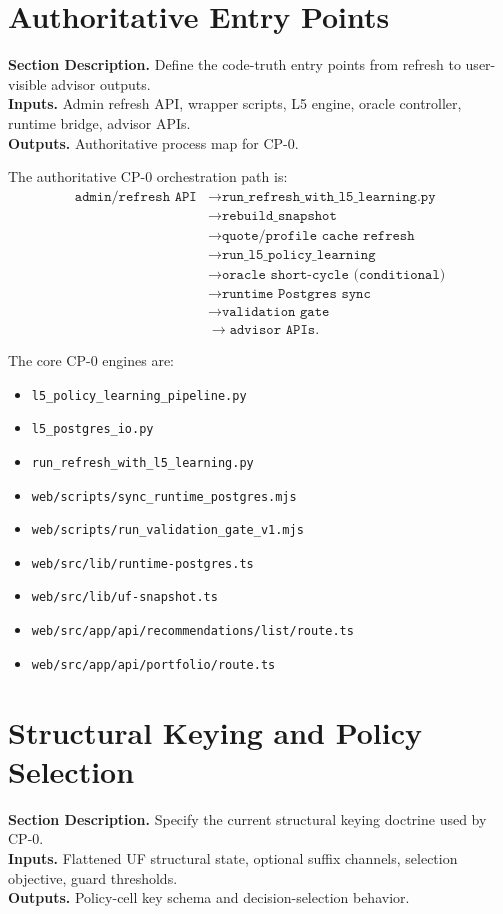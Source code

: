 \documentclass[11pt]{report}
\newcommand{\meta}[3]{\textbf{Section Description.} #1\\
\textbf{Inputs.} #2\\
\textbf{Outputs.} #3\par}
\begin{document}
\section{Authoritative Entry Points}
\meta{Define the code-truth entry points from refresh to user-visible advisor outputs.}{Admin refresh API, wrapper scripts, L5 engine, oracle controller, runtime bridge, advisor APIs.}{Authoritative process map for CP-0.}

The authoritative CP-0 orchestration path is:
\begin{align*}
\texttt{admin/refresh API} &\rightarrow \texttt{run\_refresh\_with\_l5\_learning.py} \\
&\rightarrow \texttt{rebuild\_snapshot} \\
&\rightarrow \texttt{quote/profile cache refresh} \\
&\rightarrow \texttt{run\_l5\_policy\_learning} \\
&\rightarrow \texttt{oracle short-cycle (conditional)} \\
&\rightarrow \texttt{runtime Postgres sync} \\
&\rightarrow \texttt{validation gate} \\
&\rightarrow \texttt{advisor APIs}. 
\end{align*}

The core CP-0 engines are:
\begin{itemize}
    \item \texttt{l5\_policy\_learning\_pipeline.py}
    \item \texttt{l5\_postgres\_io.py}
    \item \texttt{run\_refresh\_with\_l5\_learning.py}
    \item \texttt{web/scripts/sync\_runtime\_postgres.mjs}
    \item \texttt{web/scripts/run\_validation\_gate\_v1.mjs}
    \item \texttt{web/src/lib/runtime-postgres.ts}
    \item \texttt{web/src/lib/uf-snapshot.ts}
    \item \texttt{web/src/app/api/recommendations/list/route.ts}
    \item \texttt{web/src/app/api/portfolio/route.ts}
\end{itemize}

\section{Structural Keying and Policy Selection}
\meta{Specify the current structural keying doctrine used by CP-0.}{Flattened UF structural state, optional suffix channels, selection objective, guard thresholds.}{Policy-cell key schema and decision-selection behavior.}
\end{document}
